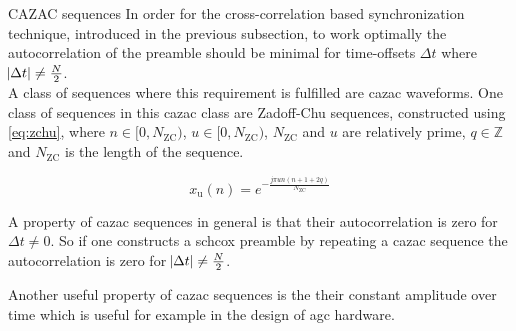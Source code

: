 \begin{subchapter}{CAZAC sequences}
  In order for the cross-correlation based synchronization technique,
  introduced in the previous subsection, to work optimally the
  autocorrelation of the preamble should be minimal for time-offsets $\Delta t$
  where $\abs{\Delta t} \neq \frac{N}{2}$. \\

  A class of sequences where this requirement is fulfilled are
  \gls{cazac} waveforms.
  One class of sequences in this \gls{cazac} class are
  Zadoff-Chu sequences\cite{zadoffchu},
  constructed using \autoref{eq:zchu}, where
  $n \in [0, N_\text{ZC})$, $u \in [0, N_\text{ZC})$,
  $N_\text{ZC}$ and $u$ are relatively prime, $q \in \mathbb{Z}$
  and $N_\text{ZC}$ is the length of the sequence\cite{zcwiki}.

  \begin{equation}
    \label{eq:zchu}
    x_\text{u}(n)= e^{- \frac{j \pi u n \left( n + 1 + 2q \right) }{N_\text{ZC}}}
  \end{equation}

  A property of \gls{cazac} sequences in general is that
  their autocorrelation is zero for $\Delta t \neq 0$.
  So if one constructs a \gls{schcox} preamble by repeating
  a \gls{cazac} sequence the autocorrelation is
  zero for $\abs{\Delta t} \neq \frac{N}{2}$.

  Another useful property of \gls{cazac} sequences is
  the their constant amplitude over time
  which is useful for example in the design
  of \gls{agc} hardware.
\end{subchapter}

